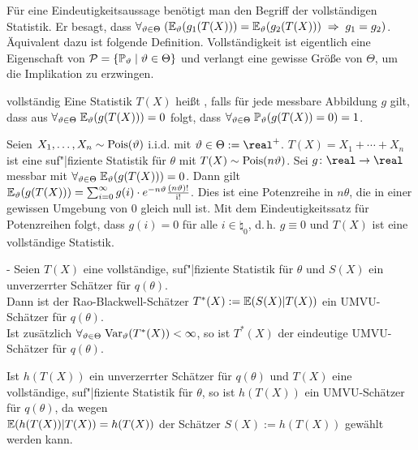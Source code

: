 \linie

\begin{Bem}
    Für eine Eindeutigkeitsaussage benötigt man den Begriff der vollständigen Statistik.
    Er besagt, dass $\forall_{\vartheta \in \Theta}\;
    (\mathbb{E}_\vartheta(g_1(T(X))) = \mathbb{E}_\vartheta(g_2(T(X))) \;\Rightarrow\; g_1 = g_2)$.
    Äquivalent dazu ist folgende Definition.
    Vollständigkeit ist eigentlich eine Eigenschaft von
    $\mathcal{P} = \{\mathbb{P}_\vartheta \;|\; \vartheta \in \Theta\}$ und verlangt eine gewisse Größe von $\Theta$,
    um die Implikation zu erzwingen.
\end{Bem}

\begin{Def}{vollständig}
    Eine Statistik $T(X)$ heißt , falls für jede messbare Abbildung
    $g$ gilt, dass aus $\forall_{\vartheta \in \Theta}\; \mathbb{E}_\vartheta(g(T(X))) = 0$ folgt, dass
    $\forall_{\vartheta \in \Theta}\; \mathbb{P}_\vartheta(g(T(X)) = 0) = 1$.
\end{Def}

\begin{Bsp}
    Seien $X_1, \dotsc, X_n \sim \operatorname{Pois}(\vartheta)$ i.i.d. mit $\theta \in \Theta := \real^+$.
    $T(X) = X_1 + \dotsb + X_n$ ist eine suf"|fiziente Statistik für $\theta$ mit
    $T(X) \sim \operatorname{Pois}(n\vartheta)$.
    Sei $g\colon \real \rightarrow \real$ messbar mit
    $\forall_{\vartheta \in \Theta}\; \mathbb{E}_\vartheta(g(T(X))) = 0$.
    Dann gilt $\mathbb{E}_\vartheta(g(T(X))) = \sum_{i=0}^\infty g(i) \cdot e^{-n\vartheta}
    \frac{(n\vartheta)!}{\mathrm{i}!}$.
    Dies ist eine Potenzreihe in $n\theta$, die in einer gewissen Umgebung von $0$ gleich
    null ist.
    Mit dem Eindeutigkeitssatz für Potenzreihen folgt, dass $g(i) = 0$ für alle $i \in \natural_0$,
    d.\,h. $g \equiv 0$ und $T(X)$ ist eine vollständige Statistik.
\end{Bsp}

\linie

\begin{Satz}{-}
    Seien $T(X)$ eine vollständige, suf"|fiziente Statistik für $\theta$ und
    $S(X)$ ein unverzerrter Schätzer für $q(\theta)$.\\
    Dann ist der Rao-Blackwell-Schätzer $T^\ast(X) := \mathbb{E}(S(X)|T(X))$ ein UMVU-Schätzer für
    $q(\theta)$.\\
    Ist zusätzlich $\forall_{\vartheta \in \Theta}\; \mathrm{Var}_\vartheta(T^\ast(X)) < \infty$, so ist
    $T^\ast(X)$ der eindeutige UMVU-Schätzer für $q(\theta)$.
\end{Satz}

\begin{Bem}
    Ist $h(T(X))$ ein unverzerrter Schätzer für $q(\theta)$ und $T(X)$ eine vollständige,
    suf"|fiziente Statistik für $\theta$, so ist $h(T(X))$ ein UMVU-Schätzer für $q(\theta)$,
    da wegen\\
    $\mathbb{E}(h(T(X))|T(X)) = h(T(X))$ der Schätzer $S(X) := h(T(X))$ gewählt werden kann.
\end{Bem}

